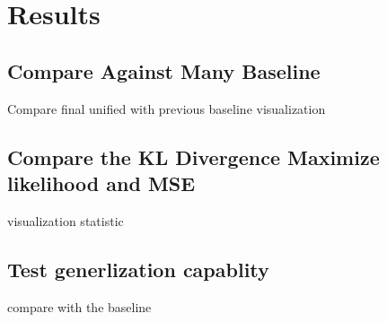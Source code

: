 \chapter{Results}

\section{Compare Against Many Baseline}
Compare final unified with previous baseline
visualization


\section{Compare the KL Divergence Maximize likelihood and MSE}
visualization 
statistic




\section{Test generlization capablity}
compare with the baseline 






